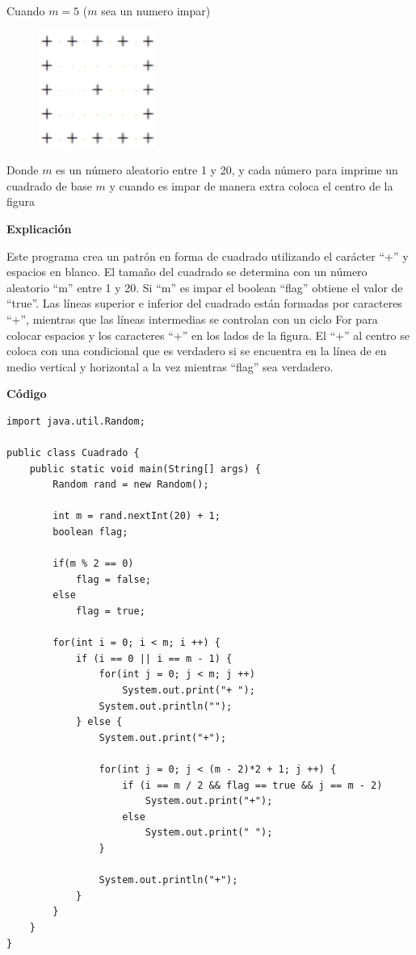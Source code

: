 \documentclass[11pt, twocolumn]{article}
\newcommand{\linejump}{\hfill \break}
\begin{document}
    Cuando $m = 5$ ($m$ sea un numero impar)
    \begin{figure}[ht]
        \includegraphics[width=0.25\columnwidth, center]{Cuadrado2.png}
    \end{figure}
    
    \linejump

    Donde $m$ es un número aleatorio entre 1 y 20, y cada número para imprime un cuadrado de base $m$ y cuando es impar de manera extra coloca el centro de la figura

    \textbf{Explicación} 

    Este programa crea un patrón en forma de cuadrado utilizando el carácter ``+'' y espacios en blanco. El tamaño del cuadrado se determina con un número aleatorio ``m'' entre 1 y 20. Si ``m'' es impar el boolean ``flag'' obtiene el valor de ``true''. Las líneas superior e inferior del cuadrado están formadas por caracteres ``+'', mientras que las líneas intermedias se controlan con un ciclo For para colocar espacios y los caracteres ``+'' en los lados de la figura. El ``+'' al centro se coloca con una condicional que es verdadero si se encuentra en la línea de en medio vertical y horizontal a la vez mientras ``flag'' sea verdadero.

    \textbf{Código}
    \begin{lstlisting}
import java.util.Random;

public class Cuadrado {
    public static void main(String[] args) {
        Random rand = new Random();

        int m = rand.nextInt(20) + 1;
        boolean flag;

        if(m % 2 == 0) 
            flag = false;
        else
            flag = true;

        for(int i = 0; i < m; i ++) {
            if (i == 0 || i == m - 1) {
                for(int j = 0; j < m; j ++)
                    System.out.print("+ ");
                System.out.println("");
            } else {
                System.out.print("+");

                for(int j = 0; j < (m - 2)*2 + 1; j ++) {
                    if (i == m / 2 && flag == true && j == m - 2)
                        System.out.print("+");
                    else
                        System.out.print(" ");
                }

                System.out.println("+");
            }
        }
    }
}  
    \end{lstlisting}
\end{document}
